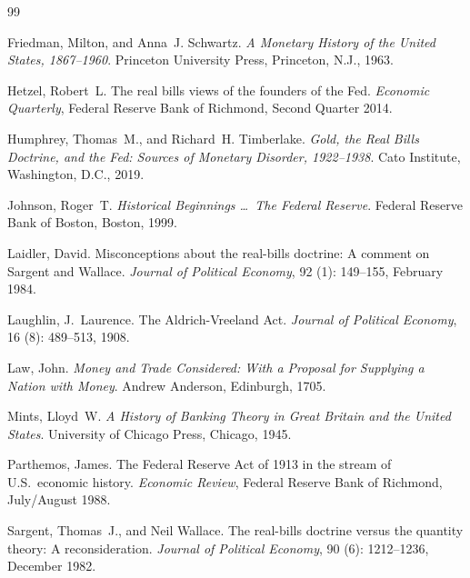 \documentclass[12pt]{article}
\begin{document}

\begin{thebibliography}{99}

  Friedman, Milton, and Anna~J. Schwartz.
  \newblock \emph{A Monetary History of the United States, 1867--1960}.
  \newblock Princeton University Press, Princeton, N.J., 1963.

  Hetzel, Robert~L.
  \newblock The real bills views of the founders of the Fed.
  \newblock \emph{Economic Quarterly}, Federal Reserve Bank of Richmond,
    Second Quarter 2014.

  Humphrey, Thomas~M., and Richard~H. Timberlake.
  \newblock \emph{Gold, the Real Bills Doctrine, and the Fed: Sources of
    Monetary Disorder, 1922--1938}.
  \newblock Cato Institute, Washington, D.C., 2019.

  Johnson, Roger~T.
  \newblock \emph{Historical Beginnings \ldots\ The Federal Reserve}.
  \newblock Federal Reserve Bank of Boston, Boston, 1999.

  Laidler, David.
  \newblock Misconceptions about the real-bills doctrine: A comment on Sargent
    and Wallace.
  \newblock \emph{Journal of Political Economy}, 92 (1):
    149--155, February 1984.

  Laughlin, J.~Laurence.
  \newblock The Aldrich-Vreeland Act.
  \newblock \emph{Journal of Political Economy}, 16 (8):
    489--513, 1908.

  Law, John.
  \newblock \emph{Money and Trade Considered: With a Proposal for Supplying a
    Nation with Money}.
  \newblock Andrew Anderson, Edinburgh, 1705.

  Mints, Lloyd~W.
  \newblock \emph{A History of Banking Theory in Great Britain and the United
    States}.
  \newblock University of Chicago Press, Chicago, 1945.

  Parthemos, James.
  \newblock The Federal Reserve Act of 1913 in the stream of U.S.\ economic
    history.
  \newblock \emph{Economic Review}, Federal Reserve Bank of Richmond,
    July/August 1988.

  Sargent, Thomas~J., and Neil Wallace.
  \newblock The real-bills doctrine versus the quantity theory: A
    reconsideration.
  \newblock \emph{Journal of Political Economy}, 90 (6):
    1212--1236, December 1982.


\end{thebibliography}
\end{document}
